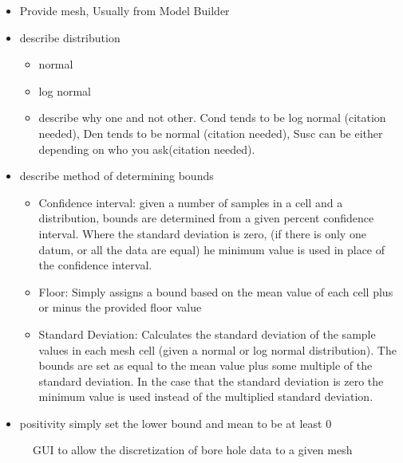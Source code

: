 \begin{itemize}
 \item Provide mesh, Usually from Model Builder
 \item describe distribution 
 \begin{itemize}
  \item normal
  \item log normal
  \item describe why one and not other. Cond tends to be log normal (citation needed), Den tends to be normal (citation needed), Susc can be either depending on who you ask(citation needed).
 \end{itemize}
 \item describe method of determining bounds
 \begin{itemize}
  \item Confidence interval: given a number of samples in a cell and a distribution, bounds are determined from a given percent confidence interval. Where the standard deviation is zero, (if there is only one datum, or all the data are equal) he minimum value is used in place of the confidence interval.
  \item Floor: Simply assigns a bound based on the mean value of each cell plus or minus the provided floor value
  \item Standard Deviation: Calculates the standard deviation of the sample values in each mesh cell (given a normal or log normal distribution). The bounds are set as equal to the mean value plus some multiple of the standard deviation. In the case that the standard deviation is zero the minimum value is used instead of the multiplied standard deviation. 
 \end{itemize}
 \item positivity simply set the lower bound and mean to be at least 0
\end{itemize}

 \begin{figure} [h]
    \centering
    \caption{\ac{GUI} to allow the discretization of bore hole data to a given mesh}
    \label{fig:disc}
\end{figure}


